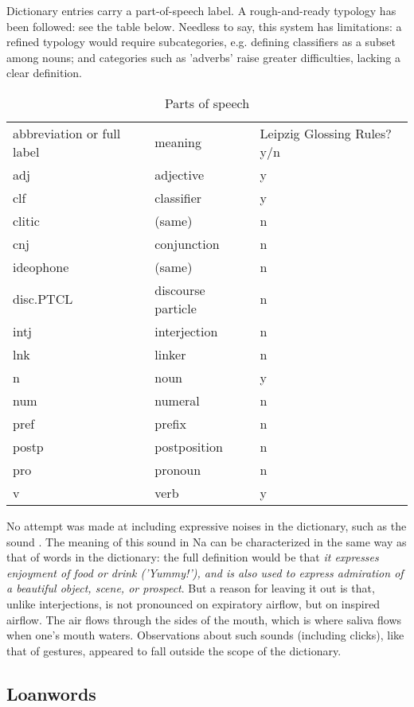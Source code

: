 Dictionary entries carry a part-of-speech label. A rough-and-ready typology has been followed: see the table below. Needless to say, this system has limitations: a refined typology would require subcategories, e.g. defining classifiers as a subset among nouns; and categories such as 'adverbs' raise greater difficulties, lacking a clear definition.
\begin{table}
	\caption{Parts of speech}
	\begin{tabular}{lll}
		abbreviation or full label & meaning & Leipzig Glossing Rules? y/n \\
		adj & adjective & y \\
		clf & classifier & y \\
		clitic & (same) & n \\
		cnj & conjunction & n \\
		ideophone & (same) & n \\
		disc.PTCL & discourse particle & n \\
		intj & interjection & n \\
		lnk & linker & n \\
		n & noun & y \\
		num & numeral & n \\
		pref & prefix & n \\
		postp & postposition & n \\
		pro & pronoun & n \\
		v & verb & y \\
	\end{tabular}
\end{table}

No attempt was made at including expressive noises in the dictionary, such as the sound . The meaning of this sound in Na can be characterized in the same way as that of words in the dictionary: the full definition would be that  \textit{it expresses enjoyment of food or drink ('Yummy!'), and is also used to express admiration of a beautiful object, scene, or prospect}. But a reason for leaving it out is that, unlike interjections,   is not pronounced on expiratory airflow, but on inspired airflow. The air flows through the sides of the mouth, which is where saliva flows when one's mouth waters. Observations about such sounds (including clicks), like that of gestures, appeared to fall outside the scope of the dictionary.

	\subsection{Loanwords} \label{sec:loan}

